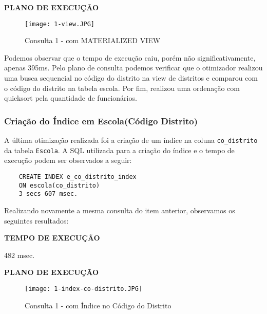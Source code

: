 \documentclass[12pt,a4paper]{article}
\begin{document}
\begin{flushleft}
\textbf{PLANO DE EXECUÇÃO}\\
\end{flushleft}

\begin{figure}[H]
    \centering
    \texttt{[image: 1-view.JPG]}
    \caption{Consulta 1 - com MATERIALIZED VIEW}
    \label{fig:diagrama}
\end{figure}

Podemos observar que o tempo de execução caiu, porém não significativamente, apenas 395ms. Pelo plano de consulta podemos verificar que o otimizador realizou uma busca sequencial no código do distrito na view de distritos e comparou com o código do distrito na tabela escola. Por fim, realizou uma ordenação com quicksort pela quantidade de funcionários.


\subsubsection{Criação do Índice em Escola(Código Distrito)}

A última otimização realizada foi a criação de um índice na coluna \texttt{co\_distrito} da tabela \texttt{Escola}. A SQL utilizada para a criação do índice e o tempo de execução podem ser observados a seguir:

\vspace{0.25cm}
\begin{verbatim}
    CREATE INDEX e_co_distrito_index 
    ON escola(co_distrito)
    3 secs 607 msec.
\end{verbatim}
\vspace{0.25cm}

Realizando novamente a mesma consulta do item anterior, observamos os seguintes resultados:

\vspace{0.01cm}
\begin{flushleft}
\textbf{TEMPO DE EXECUÇÃO}\\
\end{flushleft}
482 msec.\\

\begin{flushleft}
\textbf{PLANO DE EXECUÇÃO}\\
\end{flushleft}

\begin{figure}[H]
    \centering
    \texttt{[image: 1-index-co-distrito.JPG]}
    \caption{Consulta 1 - com Índice no Código do Distrito}
    \label{fig:diagrama}
\end{figure}
\end{document}
